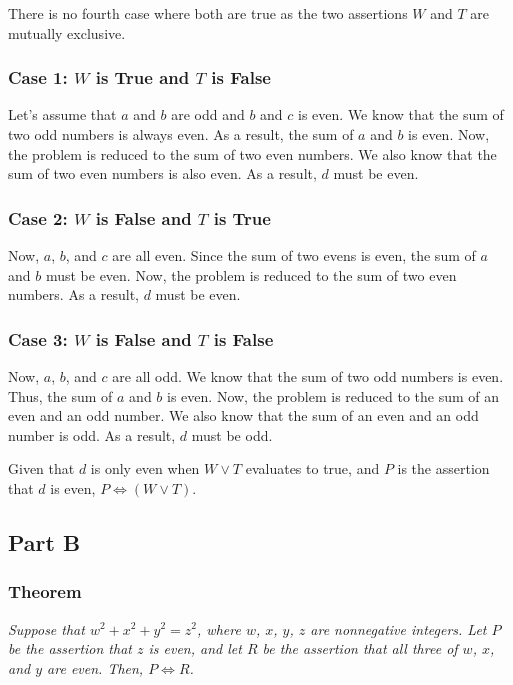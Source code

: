 \documentclass{article}
\begin{document}
There is no fourth case where both are true as the two assertions $W$ and
$T$ are mutually exclusive.

\subsubsection*{Case 1: $W$ is True and $T$ is False}

Let's assume that $a$ and $b$ are odd and $b$ and $c$ is even. We know that
the sum of two odd numbers is always even. As a result, the sum of $a$ and $b$
is even. Now, the problem is reduced to the sum of two even numbers. We also
know that the sum of two even numbers is also even. As a result, $d$ must be
even.

\subsubsection*{Case 2: $W$ is False and $T$ is True}

Now, $a$, $b$, and $c$ are all even. Since the sum of two evens is even, the sum
of $a$ and $b$ must be even. Now, the problem is reduced to the sum of two even
numbers. As a result, $d$ must be even.

\subsubsection*{Case 3: $W$ is False and $T$ is False}

Now, $a$, $b$, and $c$ are all odd. We know that the sum of two odd numbers is
even. Thus, the sum of $a$ and $b$ is even. Now, the problem is reduced to the
sum of an even and an odd number. We also know that the sum of an even and an
odd number is odd. As a result, $d$ must be odd.

\bigbreak

Given that $d$ is only even when $W \lor T$ evaluates to true, and $P$ is the
assertion that $d$ is even, $ P \iff (W \lor T) $.

\subsection*{Part B}

\subsubsection*{Theorem}

\textit{Suppose that $w^{2} + x^{2} + y^{2} = z^{2}$, where $w$, $x$, $y$, $z$
are nonnegative integers. Let $P$ be the assertion that $z$ is even, and let $R$
be the assertion that all three of $w$, $x$, and $y$ are even. Then, $P \iff R$.}
\end{document}
